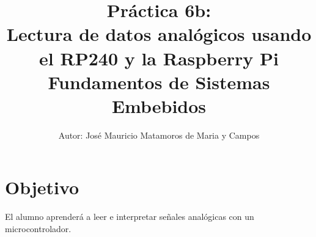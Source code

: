 \documentclass[letterpaper,10.5pt]{article}
\author{\footnotesize Autor: José Mauricio Matamoros de Maria y Campos}
\title{Práctica 6b:\\Lectura de datos analógicos usando el RP240 y la Raspberry Pi\\
{\large Fundamentos de Sistemas Embebidos}}
\date{}
\begin{document}
\maketitle

\section{Objetivo}%
\label{sec:objective}
El alumno aprenderá a leer e interpretar señales analógicas con un microcontrolador.







\appendix


\end{document}
